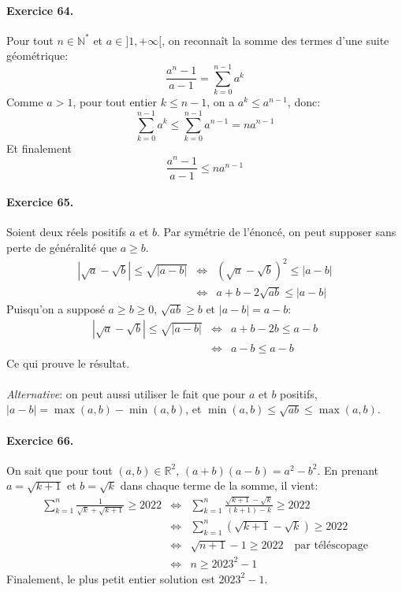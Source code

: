 \documentclass[a4paper,11pt]{article}
\begin{document}
\paragraph{Exercice 64.} Pour tout $n\in\mathbb{N}^*$ et $a\in]1,+\infty[$, on reconnaît la somme des termes d'une suite géométrique:
\[
\frac{a^n-1}{a-1} = \sum_{k=0}^{n-1}{a^k}
\]
Comme $a>1$, pour tout entier $k\leq n-1$, on a $a^k\leq a^{n-1}$, donc:
\[
\sum_{k=0}^{n-1}{a^k} \leq \sum_{k=0}^{n-1}{a^{n-1}} = na^{n-1}
\] 
Et finalement
\[
\frac{a^n-1}{a-1}  \leq na^{n-1}
\] 

\paragraph{Exercice 65.} Soient deux réels positifs $a$ et $b$. Par symétrie de l’énoncé, on peut supposer sans perte de généralité que $a\geq b$.
\begin{eqnarray}
  \left| \sqrt{a}-\sqrt{b} \right| \leq \sqrt{|a-b|} &\Leftrightarrow &  \left( \sqrt{a}-\sqrt{b} \right)^2 \leq |a-b| \nonumber \\
   &\Leftrightarrow &  a+b-2\sqrt{ab} \leq |a-b| \nonumber 
\end{eqnarray}
Puisqu'on a supposé $a \geq b \geq 0$, $\sqrt{ab}\geq b$ et $|a-b|=a-b$:
\begin{eqnarray}
  \left| \sqrt{a}-\sqrt{b} \right| \leq \sqrt{|a-b|} &\Leftrightarrow &  a+b-2b \leq a-b \nonumber \\
  &\Leftrightarrow &  a-b \leq a-b \nonumber
\end{eqnarray}
Ce qui prouve le résultat.\\ \\
\textit{Alternative}: on peut aussi utiliser le fait que pour $a$ et $b$ positifs, $|a-b|=\max(a,b)-\min(a,b)$, et $\min(a,b) \leq \sqrt{ab} \leq \max(a,b)$.
 
\paragraph{Exercice 66.} On sait que pour tout $(a,b)\in\mathbb{R}^2$, $(a+b)(a-b)=a^2-b^2$. En prenant $a=\sqrt{k+1}$ et $b=\sqrt{k}$ dans chaque terme de la somme, il vient:
\begin{eqnarray}
  \sum_{k=1}^n{\frac{1}{\sqrt{k}+\sqrt{k+1}}} \geq 2022 &\Leftrightarrow & \sum_{k=1}^n{\frac{\sqrt{k+1}-\sqrt{k}}{(k+1)-k}} \geq 2022 \nonumber \\
  &\Leftrightarrow & \sum_{k=1}^n{\left(\sqrt{k+1}-\sqrt{k}\right)} \geq 2022 \nonumber \\
  &\Leftrightarrow &  \sqrt{n+1} - 1 \geq 2022 \quad \textrm{par téléscopage}\nonumber \\
  &\Leftrightarrow &  n\geq 2023^2-1 \nonumber 
\end{eqnarray}
 Finalement, le plus petit entier solution est $2023^2-1$.
\end{document}

